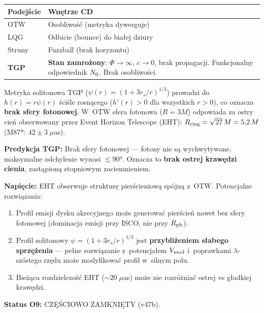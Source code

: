 \begin{center}
\begin{tabular}{@{}>{\raggedright}p{2.5cm}p{11cm}@{}}
\toprule
\textbf{Podej\'scie} & \textbf{Wn\k{e}trze CD} \\
\midrule
OTW & Osobliwo\'s\'c (metryka dywerguje) \\
LQG & Odbicie (bounce) do bia\l{}ej dziury \\
Struny & Fuzzball (brak horyzontu) \\
\textbf{TGP} & \textbf{Stan zamro\.zony}: $\Phi \to \infty$,
  $c \to 0$, brak propagacji. Funkcjonalny odpowiednik
  $N_0$. Brak osobliwo\'sci. \\
\bottomrule
\end{tabular}
\end{center}

\begin{remark}%
\label{rem:BH-shadow-tension}
Metryka solitonowa TGP ($\psi(r) = (1 + 3r_s/r)^{1/3}$)
prowadzi do $h(r) = r\psi(r)$ \'sci\'sle rosn\k{a}cego
($h'(r) > 0$ dla wszystkich $r > 0$), co oznacza
\textbf{brak sfery fotonowej}.
W~OTW sfera fotonowa ($R = 3M$) odpowiada za ostry
cie\'n obserwowany przez Event Horizon Telescope (EHT):
$R_{\rm ring} = \sqrt{27}\,M = 5{,}2\,M$ (M87*: $42 \pm 3\;\mu$as).

\textbf{Predykcja TGP:}
Brak sfery fotonowej --- fotony nie s\k{a} wychwytywane,
maksymalne odchylenie wynosi $\lesssim 90°$.
Oznacza to \textbf{brak ostrej kraw\k{e}dzi cienia},
zast\k{a}pion\k{a} stopniowym zaciemnieniem.

\textbf{Napi\k{e}cie:} EHT obserwuje struktur\k{e} pier\'scieniow\k{a}
sp\'ojn\k{a} z~OTW. Potencjalne rozwi\k{a}zania:
\begin{enumerate}[nosep]
  \item Profil emisji dysku akrecyjnego mo\.ze generowa\'c
    pier\'scie\'n nawet bez sfery fotonowej (dominacja emisji
    przy ISCO, nie przy $R_{\rm ph}$).
  \item Profil solitonowy $\psi = (1 + 3r_s/r)^{1/3}$ jest
    \textbf{przybli\.zeniem s\l{}abego sprz\k{e}\.zenia}
    --- pe\l{}ne rozwi\k{a}zanie z~potencja\l{}em $V_{\rm mod}$
    i~poprawkami $\lambda$-szóstego rz\k{e}du mo\.ze
    modyfikowa\'c profil w~silnym polu.
  \item Bie\.z\k{a}ca rozdzielczo\'s\'c EHT ($\sim 20\;\mu$as)
    mo\.ze nie rozr\'o\.znia\'c ostrej vs g\l{}adkiej kraw\k{e}dzi.
\end{enumerate}
\textbf{Status O9:} CZ\k{E}\'SCIOWO ZAMKNI\k{E}TY (v47b).


\end{remark}
